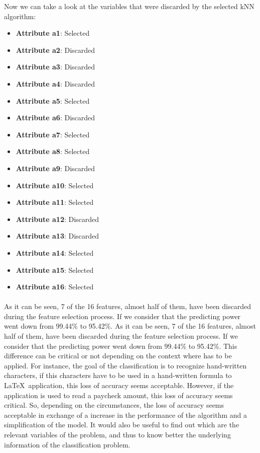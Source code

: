 \documentclass[12pt, a4paper]{article}
\begin{document}
Now we can take a look at the variables that were discarded by the selected kNN algorithm:
\begin{itemize}
	\item \textbf{Attribute a1}: Selected
	\item \textbf{Attribute a2}: Discarded
	\item \textbf{Attribute a3}: Discarded
	\item \textbf{Attribute a4}: Discarded
	\item \textbf{Attribute a5}: Selected
	\item \textbf{Attribute a6}: Discarded
	\item \textbf{Attribute a7}: Selected
	\item \textbf{Attribute a8}: Selected
	\item \textbf{Attribute a9}: Discarded
	\item \textbf{Attribute a10}: Selected
	\item \textbf{Attribute a11}: Selected
	\item \textbf{Attribute a12}: Discarded
	\item \textbf{Attribute a13}: Discarded
	\item \textbf{Attribute a14}: Selected
	\item \textbf{Attribute a15}: Selected
	\item \textbf{Attribute a16}: Selected		 
\end{itemize}
\paragraph{}As it can be seen, 7 of the 16 features, almost half of them, have been discarded during the feature selection process. If we consider that the predicting power went down from 99.44\% to 95.42\%. As it can be seen, 7 of the 16 features, almost half of them, have been discarded during the feature selection process. If we consider that the predicting power went down from 99.44\% to 95.42\%. This difference can be critical or not depending on the context where has to be applied. For instance, the goal of the classification is to recognize hand-written characters, if this characters have to be used in a hand-written formula to \LaTeX~application, this loss of accuracy seems acceptable. However, if the application is used to read a paycheck amount, this loss of accuracy seems critical. So, depending on the circumstances, the loss of accuracy seems acceptable in exchange of a increase in the performance of the algorithm and a simplification of the model. It would also be useful to find out which are the relevant variables of the problem, and thus to know better the underlying information of the classification problem.
\end{document}
